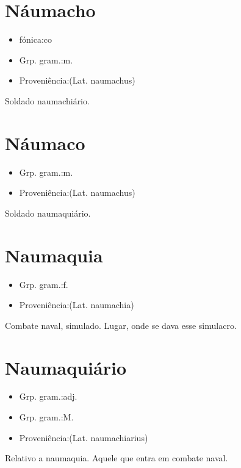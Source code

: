 \section{Náumacho}
\begin{itemize}
\item {fónica:co}
\end{itemize}
\begin{itemize}
\item {Grp. gram.:m.}
\end{itemize}
\begin{itemize}
\item {Proveniência:(Lat. \textunderscore naumachus\textunderscore )}
\end{itemize}
Soldado naumachiário.
\section{Náumaco}
\begin{itemize}
\item {Grp. gram.:m.}
\end{itemize}
\begin{itemize}
\item {Proveniência:(Lat. \textunderscore naumachus\textunderscore )}
\end{itemize}
Soldado naumaquiário.
\section{Naumaquia}
\begin{itemize}
\item {Grp. gram.:f.}
\end{itemize}
\begin{itemize}
\item {Proveniência:(Lat. \textunderscore naumachia\textunderscore )}
\end{itemize}
Combate naval, simulado.
Lugar, onde se dava esse simulacro.
\section{Naumaquiário}
\begin{itemize}
\item {Grp. gram.:adj.}
\end{itemize}
\begin{itemize}
\item {Grp. gram.:M.}
\end{itemize}
\begin{itemize}
\item {Proveniência:(Lat. \textunderscore naumachiarius\textunderscore )}
\end{itemize}
Relativo a naumaquia.
Aquele que entra em combate naval.
